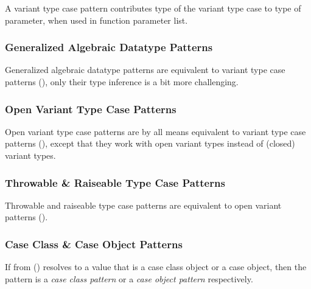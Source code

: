 A variant type case pattern contributes type of the variant type case to type of parameter, when used in function parameter list. 





\subsubsection{Generalized Algebraic Datatype Patterns}
\label{sec:gadt-patterns}

Generalized algebraic datatype patterns are equivalent to variant type case patterns (), only their type inference is a bit more challenging.





\subsubsection{Open Variant Type Case Patterns}
\label{sec:open-variant-patterns}

Open variant type case patterns are by all means equivalent to variant type case patterns (), except that they work with open variant types instead of (closed) variant types. 





\subsubsection[Throwable \& Raiseable Type Case Patterns]{Throwable \& Raiseable Type Case Patterns}
\label{sec:throwable-patterns}

Throwable and raiseable type case patterns are equivalent to open variant patterns ().





\subsubsection[Case Class \& Case Object Patterns]{Case Class \& Case Object Patterns}
\label{sec:case-class-patterns}
\label{sec:case-object-patterns}

If  from () resolves to a value that is a case class object or a case object, then the pattern is a {\em case class pattern} or a {\em case object pattern} respectively. 

